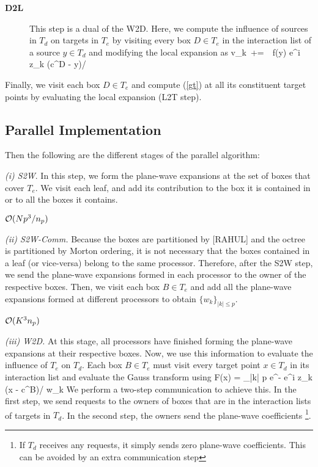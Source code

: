 \begin{description}
\item[\textbf{D2L}] This step is a dual of the W2D. Here, we compute the influence of sources in $T_d$ on targets in $T_e$ by 
visiting every box $D \in T_e$ in the interaction list of a source $y \in T_d$ and modifying the local expansion as 
%
\beq v_k  \,+=\, \, f(y) e^{i z_k \cdot (c^D - y)/\sqrt{\delta}} \eeq
\end{description}
Finally, we visit each box $D \in T_e$ and compute (\ref{gt}) at all its constituent target points by evaluating the 
local expansion (L2T step). 

\subsection{Parallel Implementation}
\label{sc:parallelnufgt}

Then the following are the different stages of the parallel algorithm:

{\em (i) S2W}. In this step, we form the plane-wave expansions at the set of boxes that cover $T_e$. 
We visit each leaf, and add its contribution to the box it is contained in or to all the boxes it contains. 

\hfill $\mathcal{O}(N p^3/n_p)$

{\em (ii) S2W-Comm.} Because the boxes are partitioned by [RAHUL] and the octree is partitioned by Morton ordering, it is not necessary that the boxes contained in a leaf (or vice-versa) belong to the same processor. Therefore, after the S2W step, we send the plane-wave expansions formed in each processor to the owner of the respective boxes. Then, we visit each box $B \in T_e$ and add all the plane-wave expansions formed at different processors to obtain $\{w_k \}_{|k| \leq p}$.  

\hfill $\mathcal{O}(K^3 n_p)$

{\em (iii) W2D.} At this stage, all processors have finished forming the plane-wave expansions at their respective boxes. 
Now, we use this information to evaluate the influence of $T_e$ on $T_d$. Each box $B \in T_e$ must visit every target point $x \in T_d$ in its interaction list and evaluate the Gauss transform using
%
\beq F(x) = \sum_{|k| \leq p} e^{-} e^{i z_k \cdot (x - c^B)/\sqrt{\delta}} w_k \eeq
%
We perform a two-step communication to achieve this. In the first step, we send requests to the owners of boxes that are in the interaction lists of targets in $T_d$. In the second step, the owners send the plane-wave coefficients \footnote{ If $T_d$ receives any requests, it simply sends zero plane-wave coefficients. This can be avoided by an extra communication step}. 

